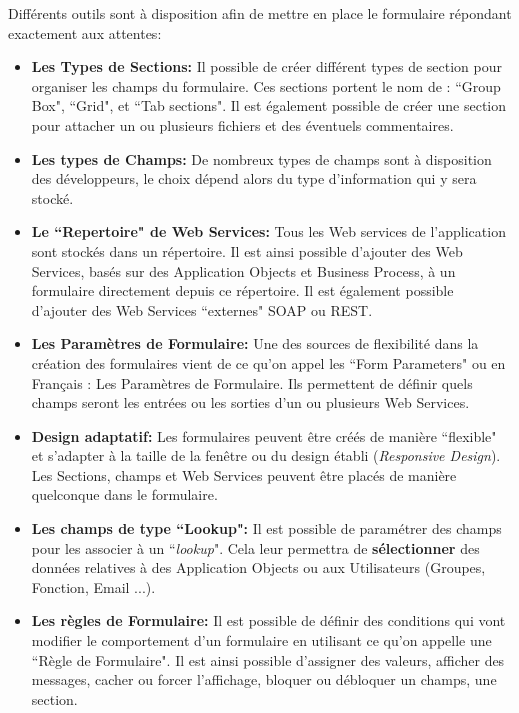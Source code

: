 Différents outils sont à disposition afin de mettre en place le formulaire répondant exactement aux attentes: 

\begin{itemize}\itemsep5pt
	\item \textbf{Les Types de Sections: }Il possible de créer différent types de section pour organiser les champs du formulaire. Ces sections portent le nom de : ``Group Box", ``Grid", et  ``Tab sections". Il est également possible de créer une section pour attacher un ou plusieurs fichiers et des éventuels commentaires.
		
	\item \textbf{Les types de Champs: }De nombreux types de champs sont à disposition des développeurs, le choix dépend alors du type d'information qui y sera stocké.
	
	\item \textbf{Le ``Repertoire" de Web Services: }Tous les Web services de l'application sont stockés dans un répertoire. Il est ainsi possible d'ajouter des Web Services, basés sur des Application Objects et Business Process, à un formulaire directement depuis ce répertoire. Il est également possible d'ajouter des Web Services ``externes" SOAP ou REST.
	
	\item \textbf{Les Paramètres de Formulaire: }Une des sources de flexibilité dans la création des formulaires vient de ce qu'on appel les ``Form Parameters" ou en Français : Les Paramètres de Formulaire. Ils permettent de définir quels champs seront les entrées ou les sorties d'un ou plusieurs Web Services.
	
	\item \textbf{Design adaptatif: }Les formulaires peuvent être créés de manière ``flexible" et s'adapter à la taille de la fenêtre ou du design établi (\textit{Responsive Design}). Les Sections, champs et Web Services peuvent être placés de manière quelconque dans le formulaire.
			
	\item \textbf{Les champs de type ``Lookup": }Il est possible de paramétrer des champs pour les associer à un ``\emph{lookup}". Cela leur permettra de \textbf{sélectionner} des données relatives à des Application Objects ou aux Utilisateurs (Groupes, Fonction, Email  ...).

	\item \textbf{Les règles de Formulaire: }Il est possible de définir des conditions qui vont modifier le comportement d'un formulaire en utilisant ce qu'on appelle une ``Règle de Formulaire". Il est ainsi possible d'assigner des valeurs, afficher des messages, cacher ou forcer l'affichage, bloquer ou débloquer un champs, une section.
	

\end{itemize}
